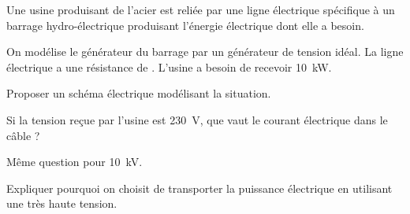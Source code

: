 

Une usine produisant de l’acier est reliée par une ligne électrique spécifique à un barrage hydro-électrique produisant l'énergie électrique dont elle a besoin.

On modélise le générateur du barrage par un générateur de tension idéal. La ligne électrique a une résistance de . L'usine a besoin de recevoir \SI{10}{kW}.

\question Proposer un schéma électrique modélisant la situation.

\question Si la tension reçue par l'usine est \SI{230}{V}, que vaut le courant électrique dans le câble ?

\question Même question pour \SI{10}{kV}.

\question Expliquer pourquoi on choisit de transporter la puissance électrique en utilisant une très haute tension.
